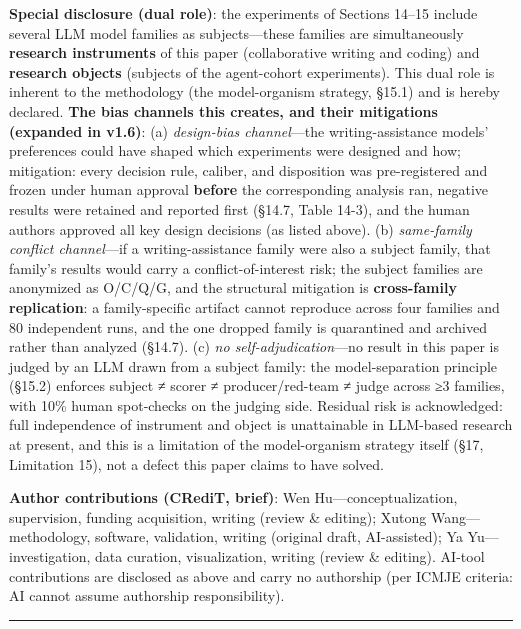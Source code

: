 \documentclass[
  11pt]{article}
\begin{document}
\textbf{Special disclosure (dual role)}: the experiments of Sections
14--15 include several LLM model families as subjects---these families
are simultaneously \textbf{research instruments} of this paper
(collaborative writing and coding) and \textbf{research objects}
(subjects of the agent-cohort experiments). This dual role is inherent
to the methodology (the model-organism strategy, §15.1) and is hereby
declared. \textbf{The bias channels this creates, and their mitigations
(expanded in v1.6)}: (a) \emph{design-bias channel}---the
writing-assistance models' preferences could have shaped which
experiments were designed and how; mitigation: every decision rule,
caliber, and disposition was pre-registered and frozen under human
approval \textbf{before} the corresponding analysis ran, negative
results were retained and reported first (§14.7, Table 14-3), and the
human authors approved all key design decisions (as listed above). (b)
\emph{same-family conflict channel}---if a writing-assistance family
were also a subject family, that family's results would carry a
conflict-of-interest risk; the subject families are anonymized as
O/C/Q/G, and the structural mitigation is \textbf{cross-family
replication}: a family-specific artifact cannot reproduce across four
families and 80 independent runs, and the one dropped family is
quarantined and archived rather than analyzed (§14.7). (c) \emph{no
self-adjudication}---no result in this paper is judged by an LLM drawn
from a subject family: the model-separation principle (§15.2) enforces
subject ≠ scorer ≠ producer/red-team ≠ judge across ≥3 families, with
10\% human spot-checks on the judging side. Residual risk is
acknowledged: full independence of instrument and object is unattainable
in LLM-based research at present, and this is a limitation of the
model-organism strategy itself (§17, Limitation 15), not a defect this
paper claims to have solved.

\textbf{Author contributions (CRediT, brief)}: Wen
Hu---conceptualization, supervision, funding acquisition, writing
(review \& editing); Xutong Wang---methodology, software, validation,
writing (original draft, AI-assisted); Ya Yu---investigation, data
curation, visualization, writing (review \& editing). AI-tool
contributions are disclosed as above and carry no authorship (per ICMJE
criteria: AI cannot assume authorship responsibility).

\begin{center}\rule{0.5\linewidth}{0.5pt}\end{center}
\end{document}
